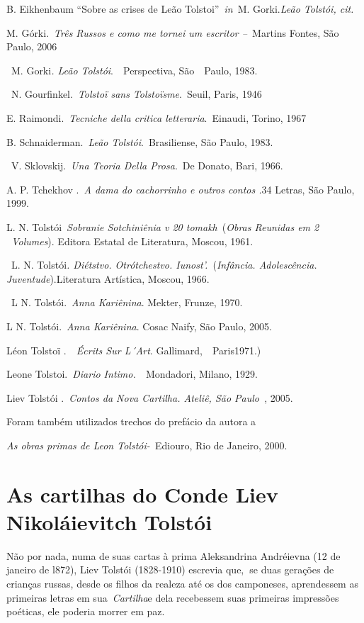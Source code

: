 B. Eikhenbaum ``Sobre as crises de Leão Tolstoi''~\emph{in~}M.
Gorki.\emph{Leão Tolstói, cit.}

M. Górki.~\emph{Três Russos e como me tornei um escritor --~}Martins
Fontes, São Paulo, 2006

~M. Gorki\emph{. Leão Tolstói}.~~Perspectiva, São~~Paulo, 1983.

~N. Gourfinkel.~\emph{Tolstoï sans Tolstoïsme}.~Seuil, Paris, 1946

E. Raimondi.~\emph{Tecniche della critica letteraria}.~Einaudi, Torino,
1967

B. Schnaiderman.~\emph{Leão Tolstói}.~Brasiliense, São Paulo, 1983.

~V. Sklovskij.~\emph{Una Teoria Della Prosa}.~De Donato, Bari, 1966.

A. P. Tchekhov .~\emph{A dama do cachorrinho e outros contos .}34
Letras, São Paulo, 1999.

L. N. Tolstói~\emph{Sobranie Sotchiniênia v 20 tomakh}~(\emph{Obras
Reunidas em 2 ~Volumes}). Editora Estatal de Literatura, Moscou, 1961.

~L. N. Tolstói\emph{. Diétstvo. Otrótchestvo. Iunost'.}~(\emph{Infância.
Adolescência.~~~} \emph{Juventude}).Literatura Artística, Moscou, 1966.

~L N. Tolstói.~\emph{Anna Kariênina}. Mekter, Frunze, 1970.

L N. Tolstói.~\emph{Anna Kariênina}. Cosac Naify, São Paulo, 2005.

Léon Tolstoï .~\emph{~Écrits Sur L´Art}. Gallimard,~~Paris1971.)

Leone Tolstoi.~\emph{Diario Intimo.~}~Mondadori, Milano, 1929.

Liev Tolstói .~\emph{Contos da Nova Cartilha. Ateliê, São Paulo~},
2005.~

Foram também utilizados trechos do prefácio da autora a

\emph{As obras primas de Leon Tolstói-~}Ediouro, Rio de Janeiro, 2000.

\chapter{As cartilhas do Conde Liev Nikoláievitch Tolstói}

Não por nada, numa de suas cartas à prima Aleksandrina Andréievna (12 de
janeiro de l872), Liev Tolstói (1828-1910) escrevia que,\textbf{~}se
duas gerações de crianças russas, desde os filhos da realeza até os dos
camponeses, aprendessem as primeiras letras em sua~\emph{Cartilha}e dela
recebessem suas primeiras impressões poéticas, ele poderia morrer em
paz.

